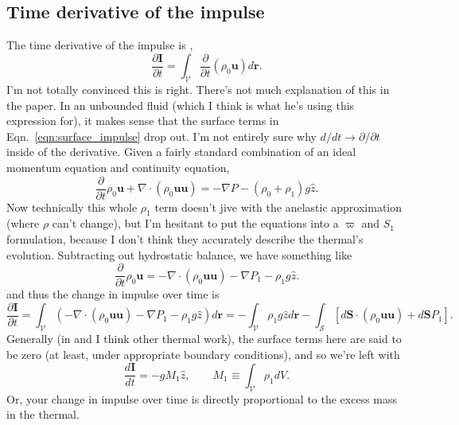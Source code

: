 \documentclass[onecolumn, amsmath, amsfonts, amssymb]{aastex62}
\newcommand{\grad}{\ensuremath{\nabla}}
\begin{document}
\subsection{Time derivative of the impulse}
The time derivative of the impulse is \citep{shivamoggi2010},
\begin{equation}
\frac{\partial \bm{I}}{\partial t} = \int_{\mathcal{V}}\frac{\partial}{\partial t}(\rho_0 \bm{u}) d\bm{r}.
\end{equation}
I'm not totally convinced this is right. There's not much explanation of this in the paper. In an unbounded
fluid (which I think is what he's using this expression for), it makes sense that the surface terms
in Eqn.~\ref{eqn:surface_impulse} drop out. I'm not entirely sure why $d/dt \rightarrow \partial/\partial t$
inside of the derivative. Given a fairly standard combination of an ideal 
momentum equation and continuity equation,
$$
\frac{\partial}{\partial t}{\rho_0 \bm{u}} + \grad\cdot(\rho_0\bm{u}\bm{u}) = -\grad P - (\rho_0 + \rho_1) g \hat{z}.
$$
Now technically this whole $\rho_1$ term doesn't jive with the anelastic approximation (where $\rho$ can't change),
but I'm hesitant to put the equations into a $\varpi$ and $S_1$ formulation, because I don't think they accurately describe
the thermal's evolution. Subtracting out hydrostatic balance, we have something like
$$
\frac{\partial}{\partial t}{\rho_0 \bm{u}} = - \grad\cdot(\rho_0\bm{u}\bm{u}) - \grad P_1 - \rho_1 g \hat{z}.
$$
and thus the change in impulse over time is
\begin{equation}
\frac{\partial \bm{I}}{\partial t} = 
\int_{\mathcal{V}}\left(
- \grad\cdot(\rho_0\bm{u}\bm{u}) - \grad P_1 - \rho_1 g \hat{z}
\right)d\bm{r}
= -\int_{\mathcal{V}}\rho_1 g\hat{z} d\bm{r} -
\int_{\mathcal{S}} [d\bm{S}\cdot(\rho_0\bm{u}\bm{u}) + d\bm{S}P_1].
\end{equation}
Generally (in \citet{shivamoggi2010} and I think other thermal work), the
surface terms here are said to be zero (at least, under appropriate boundary
conditions), and so we're left with
\begin{equation}
\boxed{
\frac{d\bm{I}}{dt} = -gM_1 \hat{z}, \qquad M_1 \equiv \int_{\mathcal{V}}\rho_1 dV
}.
\end{equation}
Or, your change in impulse over time is directly proportional to the excess mass
in the thermal.
\end{document}
